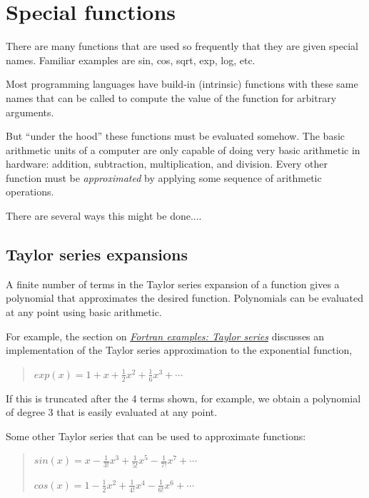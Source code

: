 \documentclass[letterpaper,10pt,english]{sphinxmanual}
\begin{document}
\section{Special functions}
\label{special_functions:special-functions}\label{special_functions::doc}\label{special_functions:id1}
There are many functions that are used so frequently that they are given
special names. Familiar examples are sin, cos, sqrt, exp, log, etc.

Most programming languages have build-in (intrinsic) functions with these
same names that can be called to compute the value of the function for
arbitrary arguments.

But ``under the hood'' these functions must be evaluated somehow.  The basic
arithmetic units of a computer are only capable of doing very basic
arithmetic in hardware: addition, subtraction, multiplication, and division.
Every other function must be \emph{approximated} by applying some sequence of
arithmetic operations.

There are several ways this might be done....


\subsection{Taylor series expansions}
\label{special_functions:taylor-series-expansions}
A finite number of terms in the Taylor series expansion of a function gives
a polynomial that approximates the desired function.  Polynomials can be
evaluated at any point using basic arithmetic.

For example, the section on {\hyperref[fortran_taylor:fortran-taylor]{\emph{Fortran examples: Taylor series}}} discusses an
implementation of the Taylor series approximation to the exponential
function,
\begin{quote}

$exp(x) = 1 + x + \frac 1 2 x ^2 + \frac 1 6 x^3 + \cdots$
\end{quote}

If this is truncated after the 4 terms shown, for example, we obtain a
polynomial of degree 3 that is easily evaluated at any point.

Some other Taylor series that can be used to approximate functions:
\begin{quote}

$sin(x) = x - \frac{1}{3!} x^3 + \frac 1 {5!} x^5 - \frac{1}{7!} x^7 + \cdots$

$cos(x) = 1 - \frac 1 2 x^2 + \frac{1}{4!} x^4 - \frac{1}{6!} x^6 + \cdots$
\end{quote}
\end{document}
